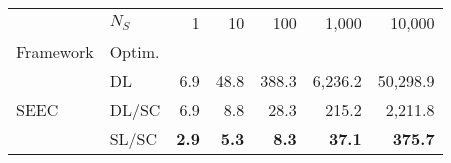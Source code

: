 \begin{tabular}{llrrrrr}
\toprule
 & $N_S$ & 1 & 10 & 100 & 1,000 & 10,000 \\
Framework & Optim. &  &  &  &  &  \\
\midrule
\multirow[c]{3}{*}{SEEC} & DL & 6.9 & 48.8 & 388.3 & 6,236.2 & 50,298.9 \\
 & DL/SC & 6.9 & 8.8 & 28.3 & 215.2 & 2,211.8 \\
 & SL/SC & \bfseries 2.9 & \bfseries 5.3 & \bfseries 8.3 & \bfseries 37.1 & \bfseries 375.7 \\
\bottomrule
\end{tabular}
